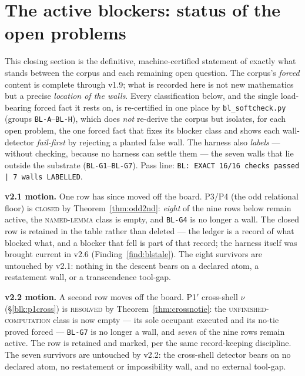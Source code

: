 \documentclass[11pt]{article}
\newcommand{\hx}[1]{\textcolor{cC}{\footnotesize\texttt{#1}}}
\theoremstyle{plain}
\theoremstyle{definition}
\theoremstyle{remark}
\begin{document}
\section{The active blockers: status of the open problems}\label{sec:blockers}

This closing section is the definitive, machine-certified statement of exactly
what stands between the corpus and each remaining open question. The corpus's
\emph{forced} content is complete through v1.9; what is recorded here is not new
mathematics but a precise \emph{location of the walls}. Every classification
below, and the single load-bearing forced fact it rests on, is re-certified in
one place by \texttt{bl\_softcheck.py} (groups \hx{BL-A}--\hx{BL-H}), which does
\emph{not} re-derive the corpus but isolates, for each open problem, the one
forced fact that fixes its blocker class and shows each wall-detector
\emph{fail-first} by rejecting a planted false wall. The harness also
\emph{labels} --- without checking, because no harness can settle them --- the
seven walls that lie outside the substrate (\hx{BL-G1}--\hx{BL-G7}). Pass line:
\texttt{BL: EXACT 16/16 checks passed | 7 walls LABELLED}.

\smallskip\noindent
\textbf{v2.1 motion.} One row has since moved off the board. P3/P4 (the odd
relational floor) is \textsc{closed} by Theorem~\ref{thm:odd2nd}: \emph{eight}
of the nine rows below remain active, the \textsc{named-lemma} class is empty,
and \hx{BL-G4} is no longer a wall. The closed row is retained in the table
rather than deleted --- the ledger is a record of what blocked what, and a
blocker that fell is part of that record; the harness itself was brought current
in v2.6 (Finding~\ref{find:blstale}).
The eight survivors are untouched by v2.1: nothing in the descent bears on a
declared atom, a restatement wall, or a transcendence tool-gap.

\smallskip\noindent
\textbf{v2.2 motion.} A second row moves off the board. P1$'$ cross-shell $\nu$
(\S\ref{blk:p1cross}) is \textsc{resolved} by Theorem~\ref{thm:crossnotie}: the
\textsc{unfinished-computation} class is now empty --- its sole occupant executed
and its no-tie proved forced --- \hx{BL-G7} is no longer a wall, and \emph{seven}
of the nine rows remain active. The row is retained and marked, per the same
record-keeping discipline. The seven survivors are untouched by v2.2: the
cross-shell detector bears on no declared atom, no restatement or impossibility
wall, and no external tool-gap.
\end{document}

